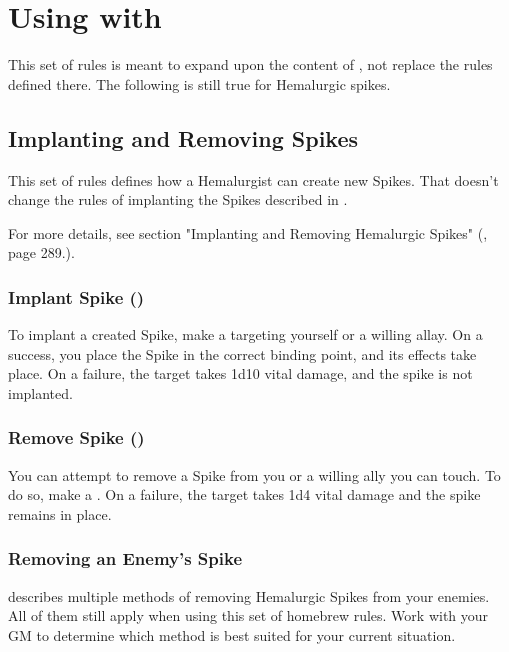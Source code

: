 \section{Using with \handbookMistborn{}}
\label{sec:otherRules}

This set of rules is meant to expand upon the content of \handbookMistborn{}, not replace the rules defined there. The following is still true for Hemalurgic spikes.

\subsection{Implanting and Removing Spikes}

This set of rules defines how a Hemalurgist can create new Spikes. That doesn't change the rules of implanting the Spikes described in \handbookMistborn{}.

For more details, see section "Implanting and Removing Hemalurgic Spikes" (\handbookMistborn{}, page 289.).

\subsubsection{Implant Spike (\iconActionTriple[8pt]{})}

To implant a created Spike, make a  targeting yourself or a willing allay. On a success, you place the Spike in the correct binding point, and its effects take place. On a failure, the target takes 1d10 vital damage, and the spike is not implanted.

\subsubsection{Remove Spike (\iconAction[8pt]{})}

You can attempt to remove a Spike from you or a willing ally you can touch. To do so, make a . On a failure, the target takes 1d4 vital damage and the spike remains in place.

\subsubsection{Removing an Enemy’s Spike}

\handbookMistborn{} describes multiple methods of removing Hemalurgic Spikes from your enemies. All of them still apply when using this set of homebrew rules. Work with your GM to determine which method is best suited for your current situation.



